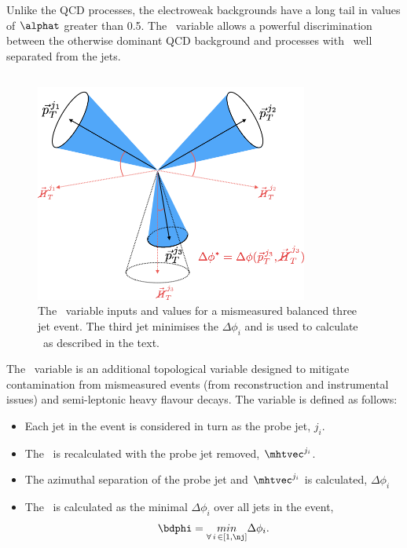 Unlike the QCD processes, the electroweak backgrounds have a long tail in
values of $\alphat$ greater than 0.5. The \alphat~variable allows a powerful discrimination 
between the otherwise dominant QCD background and processes with \met~well
separated from the jets.


\subsection{\bdphi}
\begin{figure}
\centering
    \includegraphics[width=0.8\textwidth]{./Figures/alphat/bdphi_cartoon}
  \caption{\label{fig:bdphi_cartoon} The \bdphi~variable inputs and values for a mismeasured balanced three jet event.
  The third jet minimises the $\Delta \phi_i$ and is used to calculate \bdphi~as described in the text.}
\end{figure}
The \bdphi~variable is an additional topological variable designed to mitigate contamination
from mismeasured events (from reconstruction and instrumental issues) and semi-leptonic 
heavy flavour decays. The variable is defined as follows:
\begin{itemize}
\item Each jet in the event is considered in turn as the probe jet, $j_i$.
\item The \mhtvec~is recalculated with the probe jet removed, $\mhtvec^{j_i}$.
\item The azimuthal separation of the probe jet and $\mhtvec^{j_i}$ is calculated, $\Delta \phi_i$
\item The \bdphi~is calculated as the minimal $\Delta \phi_i$ over all jets in the event,
\begin{equation}
\label{equ:bdphi}
\bdphi = \underset{\forall\, i\, \in \left[1,\nj\right]}{min} \Delta \phi_i.
\end{equation}
\end{itemize}

